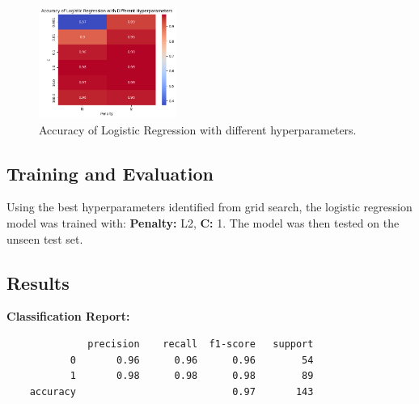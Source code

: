 \documentclass[12pt]{article}
\begin{document}
\setlength{\textfloatsep}{5pt} %
\begin{figure}[H]
\centering 
\includegraphics[width=0.4\textwidth]{assets/lr/lr-param.png} \caption{Accuracy of Logistic Regression with different hyperparameters.} \label{fig:logreg_heatmap} \end{figure}
\vspace{-20pt} %
\subsection*{Training and Evaluation}

Using the best hyperparameters identified from grid search, the logistic regression model was trained with: \textbf{Penalty:} L2, \textbf{C:} 1. The model was then tested on the unseen test set.


\subsection*{Results}
\textbf{Classification Report:}
\begin{verbatim}
              precision    recall  f1-score   support
           0       0.96      0.96      0.96        54
           1       0.98      0.98      0.98        89
    accuracy                           0.97       143
\end{verbatim}
\vspace{-10pt} %
\end{document}
